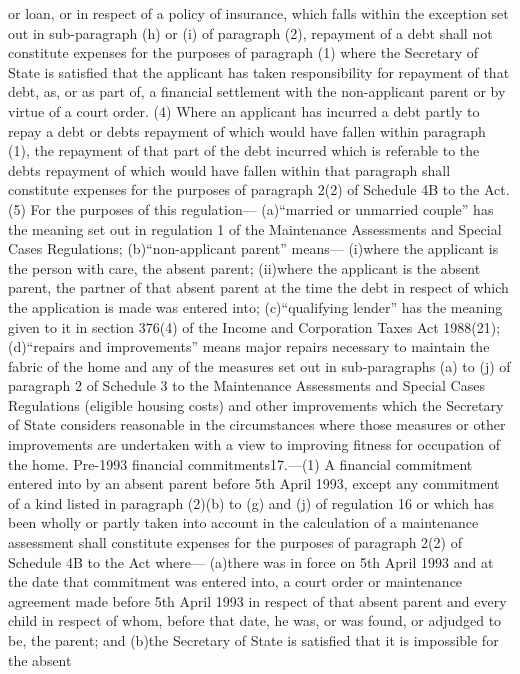 \documentclass[a4paper]{article}
\begin{document}
or loan, or in respect of a policy of insurance, which falls within the
exception set out in sub-paragraph (h) or (i) of paragraph (2), repayment of a
debt shall not constitute expenses for the purposes of paragraph (1) where the
Secretary of State is satisfied that the applicant has taken responsibility for
repayment of that debt, as, or as part of, a financial settlement with the
non-applicant parent or by virtue of a court order.
(4) Where an applicant has incurred a debt partly to repay a debt or debts
repayment of which would have fallen within paragraph (1), the repayment of that
part of the debt incurred which is referable to the debts repayment of which
would have fallen within that paragraph shall constitute expenses for the
purposes of paragraph 2(2) of Schedule 4B to the Act.
(5) For the purposes of this regulation—
(a)“married or unmarried couple” has the meaning set out in regulation 1 of the
Maintenance Assessments and Special Cases Regulations;
(b)“non-applicant parent” means—
(i)where the applicant is the person with care, the absent parent;
(ii)where the applicant is the absent parent, the partner of that absent parent
at the time the debt in respect of which the application is made was entered
into;
(c)“qualifying lender” has the meaning given to it in section 376(4) of the
Income and Corporation Taxes Act 1988(21);
(d)“repairs and improvements” means major repairs necessary to maintain the
fabric of the home and any of the measures set out in sub-paragraphs (a) to (j)
of paragraph 2 of Schedule 3 to the Maintenance Assessments and Special Cases
Regulations (eligible housing costs) and other improvements which the Secretary
of State considers reasonable in the circumstances where those measures or other
improvements are undertaken with a view to improving fitness for occupation of
the home.
Pre-1993 financial commitments17.—(1) A financial commitment entered into by an
absent parent before 5th April 1993, except any commitment of a kind listed in
paragraph (2)(b) to (g) and (j) of regulation 16 or which has been wholly or
partly taken into account in the calculation of a maintenance assessment shall
constitute expenses for the purposes of paragraph 2(2) of Schedule 4B to the Act
where—
(a)there was in force on 5th April 1993 and at the date that commitment was
entered into, a court order or maintenance agreement made before 5th April 1993
in respect of that absent parent and every child in respect of whom, before that
date, he was, or was found, or adjudged to be, the parent; and
(b)the Secretary of State is satisfied that it is impossible for the absent
\end{document}

